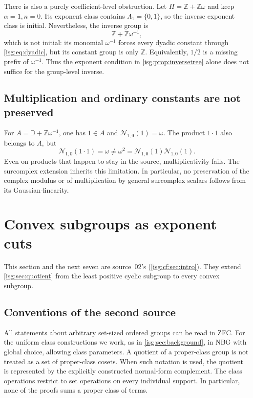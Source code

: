 \documentclass[11pt]{article}
\theoremstyle{definition}
\theoremstyle{remark}
\newcommand{\Z}{\mathbb{Z}}
\newcommand{\D}{\mathbb{D}}
\begin{document}
There is also a purely coefficient-level obstruction. Let
$H=\Z+\Z\omega$ and keep $\alpha=1,n=0$. Its exponent class contains
$\Lambda_1=\{0,1\}$, so the inverse exponent class is initial.
Nevertheless, the inverse group is
\[
 \Z+\Z\omega^{-1},
\]
which is not initial: its monomial $\omega^{-1}$ forces every dyadic
constant through \eqref{isg:eq:dyadic}, but its constant group is only
$\Z$. Equivalently, $1/2$ is a missing prefix of $\omega^{-1}$.
Thus the exponent condition in \cref{isg:prop:inversetree} alone does not
suffice for the group-level inverse.

\subsection{Multiplication and ordinary constants are not preserved}
For $A=\D+\Z\omega^{-1}$, one has $1\in A$ and
$\mathcal N_{1,0}(1)=\omega$. The product $1\cdot1$ also belongs to
$A$, but
\[
 \mathcal N_{1,0}(1\cdot1)=\omega
 \ne\omega^2=
 \mathcal N_{1,0}(1)\mathcal N_{1,0}(1).
\]
Even on products that happen to stay in the source, multiplicativity
fails. The surcomplex extension inherits this limitation. In particular,
no preservation of the complex modulus or of multiplication by general
surcomplex scalars follows from its Gaussian-linearity.

\section{Convex subgroups as exponent cuts}\label{isg:cf:sec:cuts}

This section and the next seven are source~02's
(\cref{isg:cf:sec:intro}). They extend \cref{isg:sec:quotient} from the
least positive cyclic subgroup to every convex subgroup.

\subsection{Conventions of the second source}\label{isg:cf:sec:conventions}
All statements about arbitrary set-sized ordered groups can be read in
ZFC. For the uniform class constructions we work, as in
\cref{isg:sec:background}, in NBG with global choice, allowing class
parameters. A quotient of a proper-class group is not treated as a set of
proper-class cosets. When such notation is used, the quotient is
represented by the explicitly constructed normal-form complement. The
class operations restrict to set operations on every individual support.
In particular, none of the proofs sums a proper class of terms.
\end{document}
